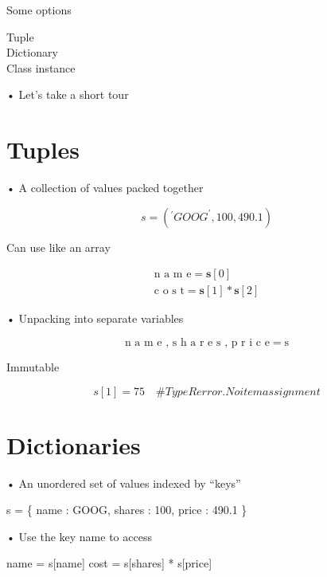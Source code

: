 \documentclass[
  letterpaper,
  DIV=11,
  numbers=noendperiod]{scrreprt}
\newenvironment{Shaded}{\begin{snugshade}}{\end{snugshade}}
\newcommand{\NormalTok}[1]{\textcolor[rgb]{0.00,0.23,0.31}{#1}}
\newcommand{\OperatorTok}[1]{\textcolor[rgb]{0.37,0.37,0.37}{#1}}
\newcommand{\StringTok}[1]{\textcolor[rgb]{0.13,0.47,0.30}{#1}}
\begin{document}
Some options

Tuple\\
Dictionary\\
Class instance

• Let's take a short tour


\chapter{Tuples}\label{tuples}

• A collection of values packed together

\[
s = \left(^ {\prime} G O O G ^ {\prime}, 1 0 0, 4 9 0. 1\right)
\]

Can use like an array

\[
\begin{array}{l} \text {n a m e} = \mathbf {s} [ 0 ] \\ \text {c o s t} = \mathbf {s} [ 1 ] * \mathbf {s} [ 2 ] \end{array}
\]

• Unpacking into separate variables

\[
\text {n a m e , s h a r e s , p r i c e} = \mathrm {s}
\]

Immutable

\[
s [ 1 ] = 7 5 \quad \# T y p e R e r r o r. N o i t e m a s s i g n m e n t
\]


\chapter{Dictionaries}\label{dictionaries}

• An unordered set of values indexed by ``keys''

\begin{Shaded}
\begin{Highlighting}[]
\NormalTok{s = \{}
\NormalTok{    \textquotesingle{}name\textquotesingle{} : \textquotesingle{}GOOG\textquotesingle{},}
\NormalTok{    \textquotesingle{}shares\textquotesingle{} : 100,}
\NormalTok{    \textquotesingle{}price\textquotesingle{} : 490.1}
\NormalTok{\} }
\end{Highlighting}
\end{Shaded}

• Use the key name to access

\begin{Shaded}
\begin{Highlighting}[]
\NormalTok{name }\OperatorTok{=}\NormalTok{ s[}\StringTok{\textquotesingle{}name\textquotesingle{}}\NormalTok{]}
\NormalTok{cost }\OperatorTok{=}\NormalTok{ s[}\StringTok{\textquotesingle{}shares\textquotesingle{}}\NormalTok{] }\OperatorTok{*}\NormalTok{ s[}\StringTok{\textquotesingle{}price\textquotesingle{}}\NormalTok{] }
\end{Highlighting}
\end{Shaded}
\end{document}
